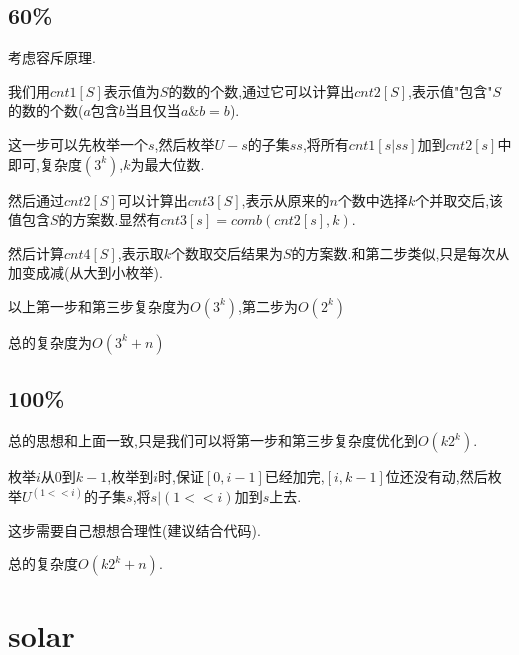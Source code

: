 \documentclass[10pt,a4paper,twoside]{article}
\begin{document}
			\subsection{60\%}
				考虑容斥原理.
				
				我们用$cnt1[S]$表示值为$S$的数的个数,通过它可以计算出$cnt2[S]$,表示值"包含"$S$的数的个数($a$包含$b$当且仅当$a\&b = b$).
				
				这一步可以先枚举一个$s$,然后枚举$U-s$的子集$ss$,将所有$cnt1[s|ss]$加到$cnt2[s]$中即可,复杂度$(3^k)$,$k$为最大位数.
				
				然后通过$cnt2[S]$可以计算出$cnt3[S]$,表示从原来的$n$个数中选择$k$个并取交后,该值包含$S$的方案数.显然有$cnt3[s] = comb(cnt2[s],k)$.
				
				然后计算$cnt4[S]$,表示取$k$个数取交后结果为$S$的方案数.和第二步类似,只是每次从加变成减(从大到小枚举).
				
				以上第一步和第三步复杂度为$O(3^k)$,第二步为$O(2^k)$
				
				总的复杂度为$O(3^k + n)$
			\subsection{100\%}
				总的思想和上面一致,只是我们可以将第一步和第三步复杂度优化到$O(k2^k)$.
				
				枚举$i$从$0$到$k-1$,枚举到$i$时,保证$[0,i-1]$已经加完,$[i,k-1]$位还没有动,然后枚举$U ^ (1<<i)$的子集$s$,将$s | (1<<i)$加到$s$上去.
				
				这步需要自己想想合理性(建议结合代码).
				
				总的复杂度$O(k2^k + n)$.
	
			\newpage
	\section{solar}
			
	
\end{document}
